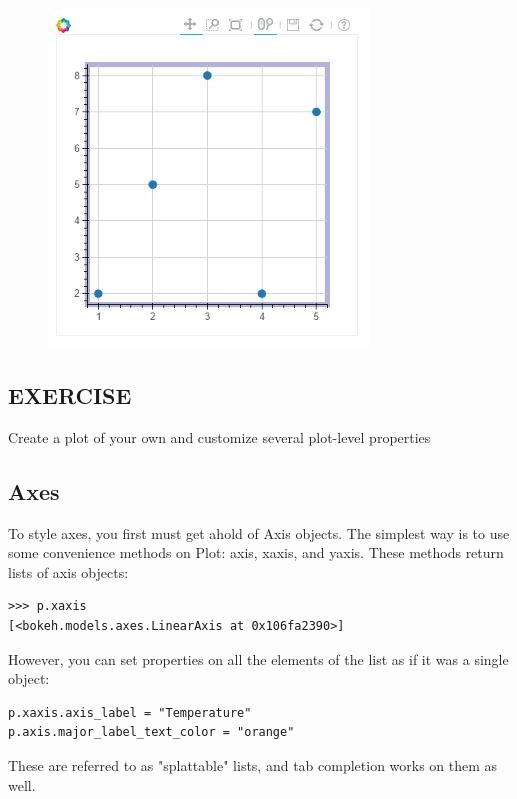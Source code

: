 \documentclass[a4paper,12pt]{article}
\begin{document}
\begin{figure}[h!]
\centering
\includegraphics[width=0.7\linewidth]{images/04-plotoutline-01}
\end{figure}

\subsection*{EXERCISE}Create a plot of your own and customize several plot-level properties



\subsection{Axes}

To style axes, you first must get ahold of Axis objects. The simplest way is to use some convenience methods on Plot: axis, xaxis, and yaxis. These methods return lists of axis objects:
\\
\begin{framed}
	\begin{verbatim}
>>> p.xaxis
[<bokeh.models.axes.LinearAxis at 0x106fa2390>]
\end{verbatim}
\end{framed}
However, you can set properties on all the elements of the list as if it was a single object:
\begin{framed}
	\begin{verbatim}
p.xaxis.axis_label = "Temperature"
p.axis.major_label_text_color = "orange"
\end{verbatim}
\end{framed}
These are referred to as "splattable" lists, and tab completion works on them as well.
\end{document}
